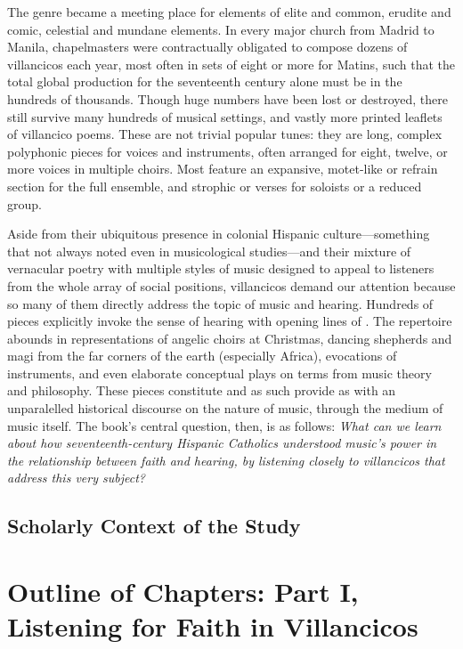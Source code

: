 \documentclass{vcbook-proposal}
\begin{document}
The genre became a meeting place for elements of elite and common, erudite and comic, celestial and mundane elements.
In every major church from Madrid to Manila, chapelmasters were contractually obligated to compose dozens of villancicos each year, most often in sets of eight or more for Matins, such that the total global production for the seventeenth century alone must be in the hundreds of thousands.
Though huge numbers have been lost or destroyed, there still survive many hundreds of musical settings, and vastly more printed leaflets of villancico poems. 
These are not trivial popular tunes: they are long, complex polyphonic pieces for voices and instruments, often arranged for eight, twelve, or more voices in multiple choirs.
Most feature an expansive, motet-like  or refrain section for the full ensemble, and strophic  or verses for soloists or a reduced group.

Aside from their ubiquitous presence in colonial Hispanic culture---something that not always noted even in musicological studies---and their mixture of vernacular poetry with multiple styles of music designed to appeal to listeners from the whole array of social positions, villancicos demand our attention because so many of them directly address the topic of music and hearing.
Hundreds of pieces explicitly invoke the sense of hearing with opening lines of   .
The repertoire abounds in representations of angelic choirs at Christmas, dancing shepherds and magi from the far corners of the earth (especially Africa), evocations of instruments, and even elaborate conceptual plays on terms from music theory and philosophy.
These pieces constitute  and as such provide as with an unparalelled historical discourse on the nature of music, through the medium of music itself.
The book's central question, then, is as follows: 
\emph{What can we learn about how seventeenth-century Hispanic Catholics understood music's power in the relationship between faith and hearing, by listening closely to villancicos that address this very subject?}

\subsection{Scholarly Context of the Study}

\section{Outline of Chapters: Part I, Listening for Faith in Villancicos}
\end{document}
